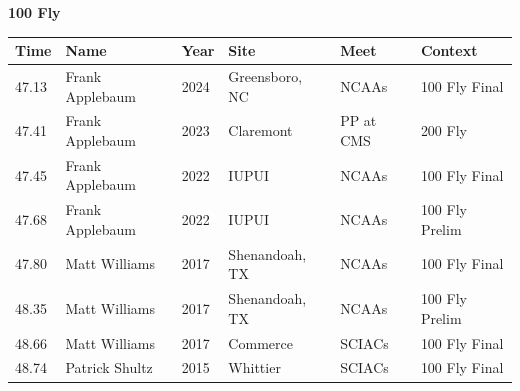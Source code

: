 \vspace{1.2em}
\noindent\begin{minipage}[t]{0.98\textwidth}
\centering
\textbf{\textcolor{teamprimary}{100 Fly}}\par
\vspace{0.5em}
\centering
\small
\renewcommand{\arraystretch}{1.0}
\setlength{\tabcolsep}{4pt}
\begin{tabular}{@{}p{2.0cm}p{3.2cm}p{1.2cm}p{2.0cm}p{2.0cm}p{2.5cm}@{}}
\toprule
\textbf{Time} & \textbf{Name} & \textbf{Year} & \textbf{Site} & \textbf{Meet} & \textbf{Context} \\
\midrule
47.13 & Frank Applebaum & 2024 & Greensboro, NC & NCAAs & 100 Fly Final \\
47.41 & Frank Applebaum & 2023 & Claremont & PP at CMS & 200 Fly \\
47.45 & Frank Applebaum & 2022 & IUPUI & NCAAs & 100 Fly Final \\
47.68 & Frank Applebaum & 2022 & IUPUI & NCAAs & 100 Fly Prelim \\
47.80 & Matt Williams & 2017 & Shenandoah, TX & NCAAs & 100 Fly Final \\
48.35 & Matt Williams & 2017 & Shenandoah, TX & NCAAs & 100 Fly Prelim \\
48.66 & Matt Williams & 2017 & Commerce & SCIACs & 100 Fly Final \\
48.74 & Patrick Shultz & 2015 & Whittier & SCIACs & 100 Fly Final \\
\bottomrule
\end{tabular}
\end{minipage}
\vspace{1.2em}
